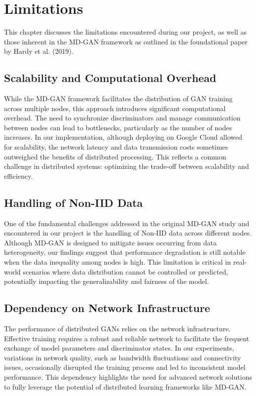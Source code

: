 \chapter{Limitations}
This chapter discusses the limitations encountered during our project, as well as those inherent in the MD-GAN framework as outlined in the foundational paper by Hardy et al. (2019).

\section{Scalability and Computational Overhead}
While the MD-GAN framework facilitates the distribution of GAN training across multiple nodes, this approach introduces significant computational overhead. The need to synchronize discriminators and manage communication between nodes can lead to bottlenecks, particularly as the number of nodes increases. In our implementation, although deploying on Google Cloud allowed for scalability, the network latency and data transmission costs sometimes outweighed the benefits of distributed processing. This reflects a common challenge in distributed systems: optimizing the trade-off between scalability and efficiency.

\section{Handling of Non-IID Data}
One of the fundamental challenges addressed in the original MD-GAN study and encountered in our project is the handling of Non-IID data across different nodes. Although MD-GAN is designed to mitigate issues occurring from data heterogeneity, our findings suggest that performance degradation is still notable when the data inequality among nodes is high. This limitation is critical in real-world scenarios where data distribution cannot be controlled or predicted, potentially impacting the generalizability and fairness of the model.

\section{Dependency on Network Infrastructure}
The performance of distributed GANs relies on the network infrastructure. Effective training requires a robust and reliable network to facilitate the frequent exchange of model parameters and discriminator states. In our experiments, variations in network quality, such as bandwidth fluctuations and connectivity issues, occasionally disrupted the training process and led to inconsistent model performance. This dependency highlights the need for advanced network solutions to fully leverage the potential of distributed learning frameworks like MD-GAN.

